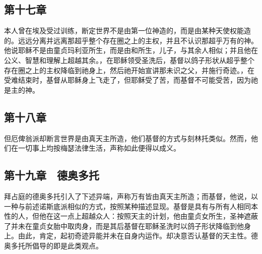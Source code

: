 
\subsection{第十七章　}

本人曾在埃及受过训练，断定世界不是由第一位神造的，而是由某种天使权能造的。远远分离并远离那超乎整个存在圈之上的主权，并且不认识那超乎万有的神。他说耶稣不是由童贞玛利亚所生，而是由和所生，儿子，与其余人相似；并且他在公义、智慧和理解上超越其余。，在耶稣领受圣洗后，基督以鸽子形状从超乎整个存在圈之上的主权降临到祂身上，然后祂开始宣讲那未识之父，并施行奇迹。，在受难结束时，基督从耶稣身上飞走了，但耶稣受了苦，而基督不可能受苦，因为祂是主的神。\par


\subsection{第十八章　}

但厄俾翁派却断言世界是由真天主所造，\newline{}他们基督的方式与刻林托类似。然而，他们在一切事上均按梅瑟法律生活，声称如此便得以成义。\par


\subsection{第十九章　德奥多托}

拜占庭的德奥多托引入了下述异端，声称万有皆由真天主所造；而基督，他说，以一种与前述诺斯底派相似的方式，按照某种描述显现。\newline{}基督是具有与所有人相同本性的人，但他在这一点上超越众人：按照天主的计划，他由童贞女所生，圣神遮蔽了并未在童贞女胎中取肉身，而是其后基督在耶稣圣洗时以鸽子形状降临到他身上。由此，肯定，起初奇迹异能并未在自身内运作。\newline{}却决意否认基督的天主性。德奥多托所倡导的即是此类观点。\par

